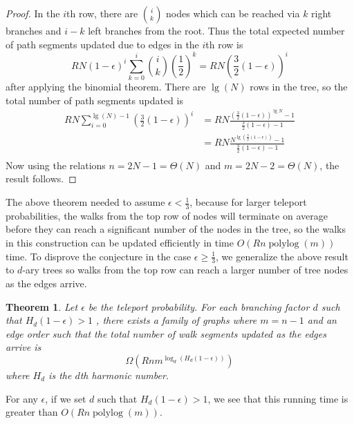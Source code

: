 \documentclass{article}
\newcommand{\pn}[1]{\left( #1 \right)}
\newtheorem{thm}{Theorem}
\DeclareMathOperator{\polylog}{polylog}
\begin{document}
\begin{proof}
In the $i$th row, there are $\binom{i}{k}$ nodes which can be reached via $k$ right branches and $i-k$ left branches from the root.  Thus the total expected number of path segments updated due to edges in the $i$th row is
\[R N(1-\epsilon)^i \sum_{k=0}^i \binom{i}{k} \left(\frac{1}{2}\right)^k = R N \left(\frac{3}{2}(1-\epsilon)\right)^i \]
after applying the binomial theorem.
 There are $\lg(N)$ rows in the tree, so the total number of path segments updated is
\begin{align*}
 R N \sum_{i=0}^{\lg(N)-1}  \pn{\frac{3}{2}(1-\epsilon)}^i &= R N \frac{\pn{\frac{3}{2}(1-\epsilon)}^{\lg{N}}-1}{\frac{3}{2} (1-\epsilon)-1}  \\
&= R N \frac{N^{\lg{\pn{\frac{3}{2}(1-\epsilon)}}}-1}{\frac{3}{2} (1-\epsilon)-1}  \\
\end{align*}
Now using the relations $n=2N-1 = \Theta(N)$ and $m=2N-2 = \Theta(N)$, the result follows.
\end{proof}

The above theorem needed to assume $\epsilon < \frac{1}{3}$, because for larger teleport probabilities, the walks from the top row of nodes will terminate on average before they can reach a significant number of the nodes in the tree, so the walks in this construction can be updated efficiently in time $O(R n \polylog(m))$ time.  To disprove the conjecture in the case $\epsilon \geq \frac{1}{3}$, we  generalize the above result to $d$-ary trees so walks from the top row can reach a larger number of tree nodes as the edges arrive.

\begin{thm} Let $\epsilon$ be the teleport probability.  For each branching factor $d$ such that $H_d (1-\epsilon) > 1$ , there exists a family of graphs where $m=n-1$ and an edge order such that the total number of walk segments updated as the edges arrive is 
\[\Omega \pn{Rn m^{\log_d(H_d (1-\epsilon))}}\]
where $H_d$ is the $d$th harmonic number.
\end{thm}
For any $\epsilon$, if we set $d$ such that $H_d (1-\epsilon) > 1$, we see that this running time is greater than
$O(Rn \polylog(m))$.  
\end{document}
